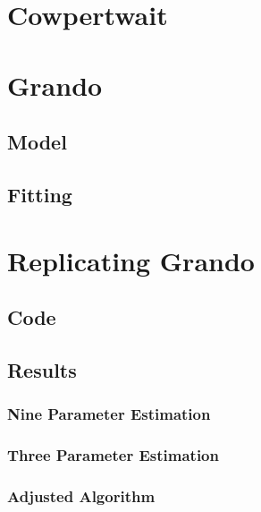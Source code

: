 
\section{Cowpertwait}
\label{Replicating_Existing_Rainfall_Model:Cowpertwait}

\section{Grando}
\label{Replicating_Existing_Rainfall_Model:Grando}

    \subsection{Model}
    \label{Replicating_Existing_Rainfall_Model:Grando:Model}

    \subsection{Fitting}
    \label{Replicating_Existing_Rainfall_Model:Grando:Fitting}

\section{Replicating Grando}
\label{Replicating_Existing_Rainfall_Model:Replicating_Grando}

    \subsection{Code}
    \label{Replicating_Existing_Rainfall_Model:Replicating_Grando:Code}

    \subsection{Results}
    \label{Replicating_Existing_Rainfall_Model:Replicating_Grando:Results}

        \subsubsection{Nine Parameter Estimation}
        \label{Replicating_Existing_Rainfall_Model:Replicating_Grando:Results:Nine_Parameter_Estimation}

        \subsubsection{Three Parameter Estimation}
        \label{Replicating_Existing_Rainfall_Model:Replicating_Grando:Results:Three_Parameter_Estimation}

        \subsubsection{Adjusted Algorithm}
        \label{Replicating_Existing_Rainfall_Model:Replicating_Grando:Results:Adjusted_Algorithm}
        




